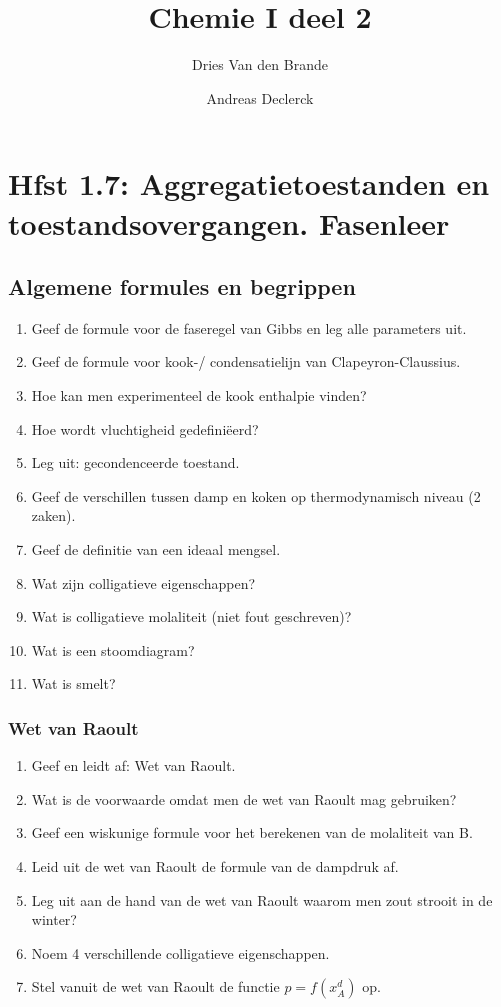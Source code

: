 \documentclass[12pt]{article}
\begin{document}
    \title{Chemie I deel 2}
    \author{Dries Van den Brande \and Andreas Declerck}

    \maketitle
    \section{Hfst 1.7: Aggregatietoestanden en toestandsovergangen. Fasenleer}

    \subsection{Algemene formules en begrippen}
    \begin{enumerate}
        \item Geef de formule voor de faseregel van Gibbs en leg alle parameters uit.
        \item Geef de formule voor kook-/ condensatielijn van Clapeyron-Claussius.
        \item Hoe kan men experimenteel de kook enthalpie vinden?
        \item Hoe wordt vluchtigheid gedefini\"eerd?
        \item Leg uit: gecondenceerde toestand.
        \item Geef de verschillen tussen damp en koken op thermodynamisch niveau (2 zaken).
        \item Geef de definitie van een ideaal mengsel.
        \item Wat zijn colligatieve eigenschappen?
        \item Wat is colligatieve molaliteit (niet fout geschreven)?
        \item Wat is een stoomdiagram?
        \item Wat is smelt?
    \end{enumerate}

    \subsubsection{Wet van Raoult}
    \begin{enumerate}
        \item Geef en leidt af: Wet van Raoult.
        \item Wat is de voorwaarde omdat men de wet van Raoult mag gebruiken?
        \item Geef een wiskunige formule voor het berekenen van de molaliteit van B.
        \item Leid uit de wet van Raoult de formule van de dampdruk af.
        \item Leg uit aan de hand van de wet van Raoult waarom men zout strooit in de winter?
        \item Noem 4 verschillende colligatieve eigenschappen.
        \item Stel vanuit de wet van Raoult de functie $ p = f(x_A^d) $ op.
    \end{enumerate}
\end{document}
